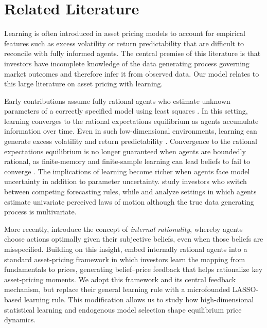 \section{Related Literature}\label{sec:literature}

Learning is often introduced in asset pricing models to account for empirical features such as excess volatility or return predictability that are difficult to reconcile with fully informed agents.
The central premise of this literature is that investors have incomplete knowledge of the data generating process governing market outcomes and therefore infer it from observed data.
Our model relates to this large literature on asset pricing with learning. 

Early contributions assume fully rational agents who estimate unknown parameters of a correctly specified model using least squares \citep{Marcet1989}. 
In this setting, learning converges to the rational expectations equilibrium as agents accumulate information over time. 
Even in such low-dimensional environments, learning can generate excess volatility and return predictability \citep{Timmermann1993,Timmermann1996}. 
Convergence to the rational expectations equilibrium is no longer guaranteed when agents are boundedly rational, as finite-memory and finite-sample learning can lead beliefs to fail to converge \citep{Honkapohja2003}. 
The implications of learning become richer when agents face model uncertainty in addition to parameter uncertainty. 
\citet{barberis1998model} study investors who switch between competing forecasting rules, while \citet{hong2007simple} and \citet{Branch2010} analyze settings in which agents estimate univariate perceived laws of motion although the true data generating process is multivariate.

More recently, \citet{adam2011internal} introduce the concept of \textit{internal rationality}, whereby agents choose actions optimally given their subjective beliefs, even when those beliefs are misspecified. 
Building on this insight, \citet{Adam2016} embed internally rational agents into a standard asset-pricing framework in which investors learn the mapping from fundamentals to prices, generating belief--price feedback that helps rationalize key asset-pricing moments. 
We adopt this framework and its central feedback mechanism, but replace their general learning rule with a microfounded LASSO-based learning rule. 
This modification allows us to study how high-dimensional statistical learning and endogenous model selection shape equilibrium price dynamics.

